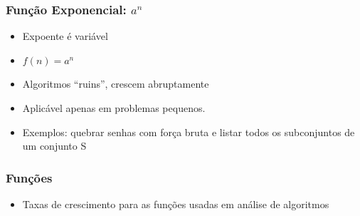 \documentclass[aspectratio=169]{beamer}
\begin{document}
\begin{frame}\frametitle{Função Exponencial: $a^n$}
\begin{itemize}
	\item Expoente é variável
	\item $f(n) = a^n$
	\item Algoritmos ``ruins'', crescem abruptamente
	\item Aplicável apenas em problemas pequenos.
	\item Exemplos: quebrar senhas com força bruta e listar todos os subconjuntos de um conjunto S
\end{itemize}
\end{frame}

\begin{frame}\frametitle{Funções}
\begin{itemize}
	\item Taxas de crescimento para as funções usadas em análise de algoritmos
\end{itemize}


\end{frame}
\end{document}
